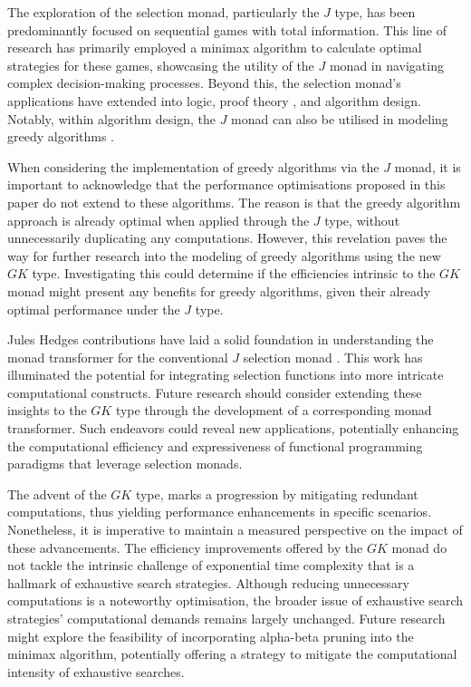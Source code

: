 \documentclass[runningheads]{llncs}
\begin{document}
The exploration of the selection monad, particularly the \(J\) type, has
been predominantly focused on sequential games with total
information\cite{escardo2010sequential}. This line of research has
primarily employed a minimax algorithm to calculate optimal strategies
for these games, showcasing the utility of the \(J\) monad in navigating
complex decision-making processes. Beyond this, the selection monad's
applications have extended into logic, proof theory
\cite{escardo2010sequential}, and algorithm design. Notably, within
algorithm design, the \(J\) monad can also be utilised in modeling
greedy algorithms \cite{hartmann2022algorithm}.

When considering the implementation of greedy algorithms via the \(J\)
monad, it is important to acknowledge that the performance optimisations
proposed in this paper do not extend to these algorithms. The reason is
that the greedy algorithm approach is already optimal when applied
through the \(J\) type, without unnecessarily duplicating any
computations. However, this revelation paves the way for further
research into the modeling of greedy algorithms using the new \(GK\)
type. Investigating this could determine if the efficiencies intrinsic
to the \(GK\) monad might present any benefits for greedy algorithms,
given their already optimal performance under the \(J\) type.

Jules Hedges contributions have laid a solid foundation in understanding
the monad transformer for the conventional \(J\) selection monad
\cite{hedges2014monad}. This work has illuminated the potential for
integrating selection functions into more intricate computational
constructs. Future research should consider extending these insights to
the \(GK\) type through the development of a corresponding monad
transformer. Such endeavors could reveal new applications, potentially
enhancing the computational efficiency and expressiveness of functional
programming paradigms that leverage selection monads.

The advent of the \(GK\) type, marks a progression by mitigating
redundant computations, thus yielding performance enhancements in
specific scenarios. Nonetheless, it is imperative to maintain a measured
perspective on the impact of these advancements. The efficiency
improvements offered by the \(GK\) monad do not tackle the intrinsic
challenge of exponential time complexity that is a hallmark of
exhaustive search strategies. Although reducing unnecessary computations
is a noteworthy optimisation, the broader issue of exhaustive search
strategies' computational demands remains largely unchanged. Future
research might explore the feasibility of incorporating alpha-beta
pruning into the minimax algorithm, potentially offering a strategy to
mitigate the computational intensity of exhaustive searches.
\end{document}
